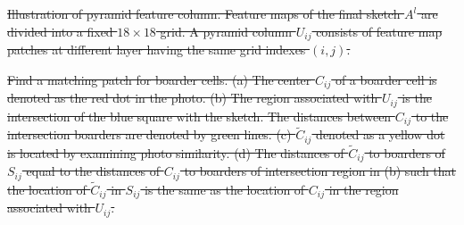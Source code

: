 \documentclass[10pt,twocolumn,letterpaper]{article}
\providecommand{\DIFdeltex}[1]{{\protect\color{red}\sout{#1}}}                      %
\providecommand{\DIFaddend}{} %
\providecommand{\DIFdelbegin}{} %
\providecommand{\DIFdelFL}[1]{\DIFdel{#1}} %
\providecommand{\DIFdel}[1]{\texorpdfstring{\DIFdeltex{#1}}{}} %
\begin{document}
\DIFaddend 

\DIFdelbegin %
{%
\DIFdelFL{Illustration of pyramid feature column. Feature maps of the final sketch $A^{l}$ are divided into a fixed $18\times18$ grid. A pyramid column $U_{ij}$ consists of feature map patches at different layer having the same grid indexes $(i, j)$.}}

{%
\DIFdelFL{Find a matching patch for boarder cells. (a) The center $C_{ij}$ of a boarder cell is denoted as the red dot in the photo. (b) The region associated with $U_{ij}$ is the intersection of the blue square with the sketch. The distances between $C_{ij}$ to the intersection boarders are denoted by green lines. (c) $\tilde{C}_{ij}$ denoted as a yellow dot is located by examining photo similarity. (d) The distances of $\tilde{C}_{ij}$ to boarders of $S_{ij}$ equal to the distances of  $C_{ij}$ to boarders of intersection region in (b) such that the location of $\tilde{C}_{ij}$ in $S_{ij}$ is the same as the location of $C_{ij}$ in the region associated with $U_{ij}$.}}
\end{document}
